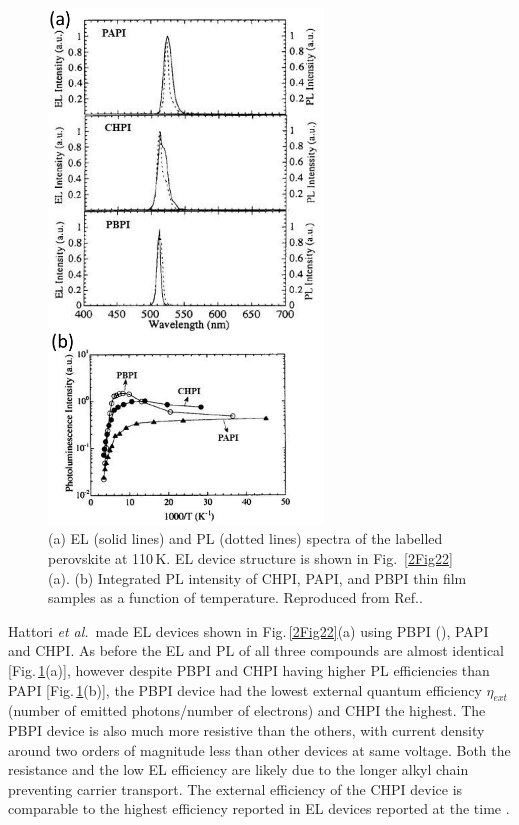 \begin{figure}[h!]
\centering
\includegraphics[width=0.65\textwidth]{Fig23}
\caption{(a) EL (solid lines) and PL (dotted lines) spectra of the labelled perovskite at 110\,K. EL device structure is shown in Fig.\ \ref{2Fig22}(a). (b) Integrated PL intensity of CHPI, PAPI, and PBPI thin film samples as a function of temperature. Reproduced from Ref.\!.}
\label{2Fig23}
\end{figure}
Hattori \textit{et al.}\ made EL devices shown in Fig.\,\ref{2Fig22}(a) using PBPI (), PAPI and CHPI. As before the EL and PL of all three compounds are almost identical [Fig.\,\ref{2Fig23}(a)], however despite PBPI and CHPI having higher PL efficiencies than PAPI [Fig.\,\ref{2Fig23}(b)], the PBPI device had the lowest external quantum efficiency $\eta_{ext}$ (number of emitted photons/number of electrons) and CHPI the highest. The PBPI device is also much more resistive than the others, with current density around two orders of magnitude less than other devices at same voltage. Both the resistance and the low EL efficiency are likely due to the longer alkyl chain preventing carrier transport. The external efficiency of the CHPI device is comparable to the highest efficiency reported in EL devices reported at the time \cite{Hattori1996}.

